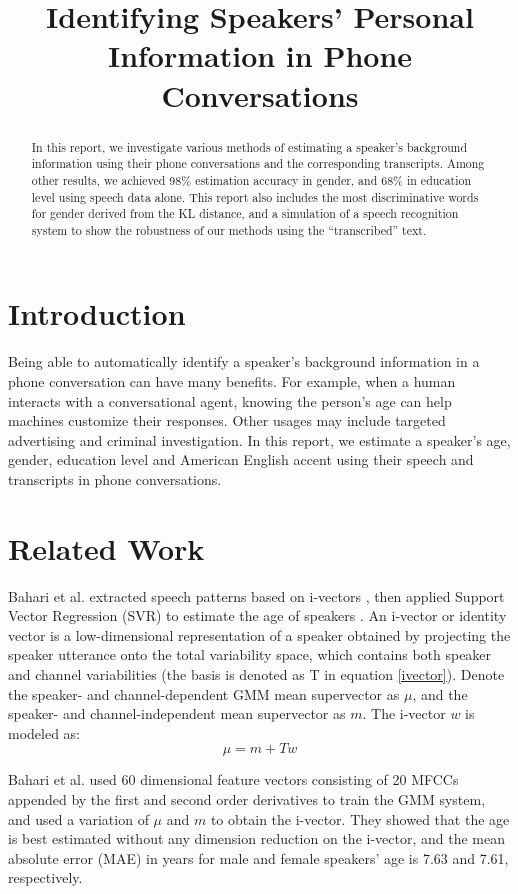 \documentclass[a4paper]{article}
\title{Identifying Speakers' Personal Information in Phone Conversations}
\begin{document}
\maketitle


\begin{abstract}
In this report, we investigate various methods of estimating a speaker's background information using their phone conversations and the corresponding transcripts. Among other results, we achieved 98\% estimation accuracy in gender, and 68\% in education level using speech data alone. This report also includes the most discriminative words for gender derived from the KL distance, and a simulation of a speech recognition system to show the robustness of our methods using the ``transcribed'' text.
\end{abstract}


\section{Introduction}
Being able to automatically identify a speaker's background information in a phone conversation can have many benefits. For example, when a human interacts with a conversational agent, knowing the person's age can help machines customize their responses. Other usages may include targeted advertising and criminal investigation. In this report, we estimate a speaker's age, gender, education level and American English accent using their speech and transcripts in phone conversations.

\section{Related Work}
Bahari et al. extracted speech patterns based on i-vectors \cite{dehak}, then applied Support Vector Regression (SVR) to estimate the age of speakers \cite{bahari}. An i-vector or identity vector is a low-dimensional representation of a speaker obtained by projecting the speaker utterance onto the total variability space, which contains both speaker and channel variabilities (the basis is denoted as T in equation \ref{ivector}). Denote the speaker- and channel-dependent GMM mean supervector as $\mu$, and the speaker- and channel-independent mean supervector as $m$. The i-vector $w$ is modeled as:  
\begin{equation}
\mu = m + Tw
\label{ivector}
\end{equation}

Bahari et al. used 60 dimensional feature vectors consisting of 20 MFCCs appended by the first and second order derivatives to train the GMM system, and used a variation of $\mu$ and $m$ to obtain the i-vector. They showed that the age is best estimated without any dimension reduction on the i-vector, and the mean absolute error (MAE) in years for male and female speakers' age is 7.63 and 7.61, respectively.
\end{document}
